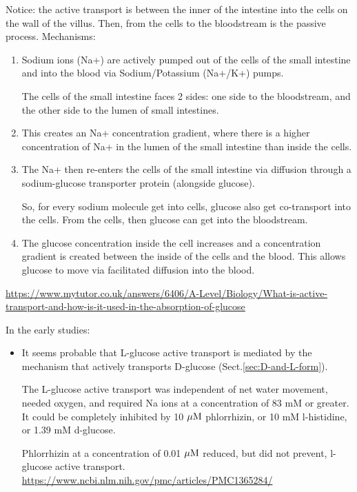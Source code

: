 Notice: the active transport is between the inner of the intestine
into the cells on the wall of the villus. Then, from the cells to the
bloodstream is the passive process.
Mechanisms:
\begin{enumerate}
  \item  Sodium ions (Na+) are actively pumped out of the cells of the small
  intestine and into the blood via Sodium/Potassium (Na+/K+) pumps.
  
 The cells of the small intestine faces 2 sides: one side to the bloodstream,
 and the other side to the lumen of small intestines.
  
  \item  This creates an Na+ concentration gradient, where there is a higher
  concentration of Na+ in the lumen of the small intestine than inside the cells.
  
  \item  The Na+ then re-enters the cells of the small intestine via diffusion
  through a sodium-glucose transporter protein (alongside glucose).
  
So, for every sodium molecule get into cells, glucose also get co-transport into
the cells. From the cells, then glucose can get into the bloodstream.
  
  \item The glucose concentration inside the cell increases and a concentration
  gradient is created between the inside of the cells and the blood. This allows
  glucose to move via facilitated diffusion into the blood.  
\end{enumerate}
\url{https://www.mytutor.co.uk/answers/6406/A-Level/Biology/What-is-active-transport-and-how-is-it-used-in-the-absorption-of-glucose}

In the early studies:
\begin{itemize}
  \item It seems probable that L-glucose active transport is mediated by the mechanism
that actively transports D-glucose (Sect.\ref{sec:D-and-L-form}).

The L-glucose active transport was independent of net water movement, needed
oxygen, and required Na ions at a concentration of 83 mM or greater. It could be
completely inhibited by 10 ${\mu\text{M}}$ phlorrhizin, or 10 mM l-histidine, or 1.39 mM
d-glucose.

Phlorrhizin at a concentration of 0.01 ${\mu\text{M}}$ reduced, but did not prevent,
l-glucose active transport.
\url{https://www.ncbi.nlm.nih.gov/pmc/articles/PMC1365284/}
\end{itemize}



